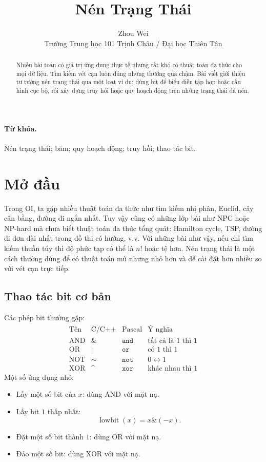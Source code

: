 \documentclass[11pt]{article}
\title{Nén Trạng Thái}
\author{Zhou Wei\\Trường Trung học 101 Trịnh Châu / Đại học Thiên Tân}
\date{}
\newcommand{\lowbit}{\operatorname{lowbit}}
\begin{document}
\maketitle


\begin{abstract}
Nhiều bài toán có giá trị ứng dụng thực tế nhưng rất khó có thuật toán đa thức
cho mọi dữ liệu. Tìm kiếm vét cạn luôn đúng nhưng thường quá chậm. Bài viết
giới thiệu tư tưởng nén trạng thái qua một loạt ví dụ: dùng bit để biểu diễn
tập hợp hoặc cấu hình cục bộ, rồi xây dựng truy hồi hoặc quy hoạch động trên
những trạng thái đã nén.
\end{abstract}

\paragraph{Từ khóa.}
Nén trạng thái; băm; quy hoạch động; truy hồi; thao tác bit.

\tableofcontents

\section{Mở đầu}

Trong OI, ta gặp nhiều thuật toán đa thức như tìm kiếm nhị phân, Euclid, cây
cân bằng, đường đi ngắn nhất. Tuy vậy cũng có những lớp bài như NPC hoặc
NP-hard mà chưa biết thuật toán đa thức tổng quát: Hamilton cycle, TSP, đường
đi đơn dài nhất trong đồ thị có hướng, v.v. Với những bài như vậy, nếu chỉ
tìm kiếm thuần túy thì độ phức tạp có thể là \(n!\) hoặc tệ hơn. Nén trạng
thái là một cách thường dùng để có thuật toán mũ nhưng nhỏ hơn và dễ cài đặt
hơn nhiều so với vét cạn trực tiếp.

\subsection{Thao tác bit cơ bản}

Các phép bit thường gặp:
\[
\begin{array}{c|c|c|c}
\text{Tên} & \text{C/C++} & \text{Pascal} & \text{Ý nghĩa}\\ \hline
\text{AND} & \& & \texttt{and} & \text{tất cả là }1\text{ thì }1\\
\text{OR} & | & \texttt{or} & \text{có }1\text{ thì }1\\
\text{NOT} & \sim & \texttt{not} & 0\leftrightarrow 1\\
\text{XOR} & \^{} & \texttt{xor} & \text{khác nhau thì }1
\end{array}
\]
Một số ứng dụng nhỏ:
\begin{itemize}
  \item Lấy một số bit của \(x\): dùng AND với mặt nạ.
  \item Lấy bit \(1\) thấp nhất:
  \[
    \lowbit(x)=x\mathbin{\&}(-x).
  \]
  \item Đặt một số bit thành \(1\): dùng OR với mặt nạ.
  \item Đảo một số bit: dùng XOR với mặt nạ.
\end{itemize}
\end{document}
